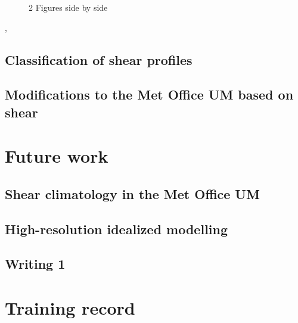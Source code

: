 \documentclass[11pt,a4paper]{article}
\begin{document}
\begin{figure}[htp!]
    \qquad
    \caption{2 Figures side by side}%
    \label{fig:example}%
\end{figure}

\cite{wilson1998nowcasting},  \cite{plant2009statistical}

\subsection{Classification of shear profiles}
\label{sec:Classification of shear profiles}

\subsection{Modifications to the Met Office UM based on shear}
\label{sec:um_mod}

\section{Future work}
\label{sec:Future work}

\subsection{Shear climatology in the Met Office UM}
\label{sec:Shear climatology in the Met Office UM}

\subsection{High-resolution idealized modelling}
\label{sec:High-resolution idealized modelling}

\subsection{Writing 1}
\label{sec:Writing 1}

\section{Training record}
\label{sec:Training record}
\end{document}
